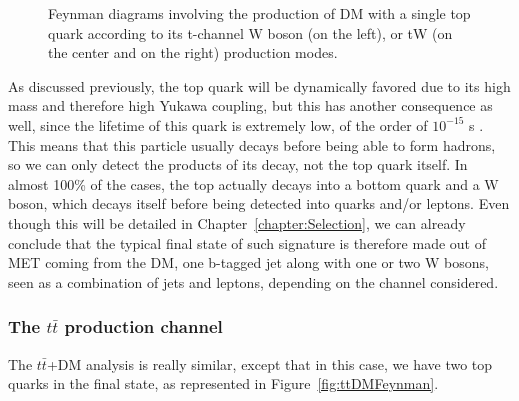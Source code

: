 \documentclass[a4paper, 10pt, openright]{report}
\begin{document}
\begin{figure}[htbp]
\begin{minipage}{.31\textwidth}
{
}
\end{minipage} \hfill
\caption{Feynman diagrams involving the production of \ac{DM} with a single top quark according to its t-channel W boson (on the left), or tW (on the center and on the right) production modes.}
\label{fig:singleTopFeynman}
\end{figure}

As discussed previously, the top quark will be dynamically favored due to its high mass and therefore high Yukawa coupling, but this has another consequence as well, since the lifetime of this quark is extremely low, of the order of $10^{-15}$ s \cite{PDG}. This means that this particle usually decays before being able to form hadrons, so we can only detect the products of its decay, not the top quark itself. In almost 100\% of the cases, the top actually decays into a bottom quark and a W boson, which decays itself before being detected into quarks and/or leptons. Even though this will be detailed in Chapter~\ref{chapter:Selection}, we can already conclude that the typical final state of such signature is therefore made out of \ac{MET} coming from the \ac{DM}, one b-tagged jet along with one or two W bosons, seen as a combination of jets and leptons, depending on the channel considered.

\subsubsection{The $t \bar t$ production channel} \label{subsection:ttChannel}

The $t \bar t$+DM analysis is really similar, except that in this case, we have two top quarks in the final state, as represented in Figure~\ref{fig:ttDMFeynman}.

\end{document}
